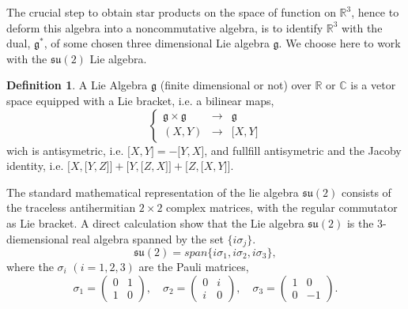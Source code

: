\documentclass[a4paper,11pt]{article} %
\numberwithin{equation}{section} %
\numberwithin{figure}{section} %
\theoremstyle{plain} %
\theoremstyle{definition} %
\newtheorem{dfn}{Definition}[section]
\theoremstyle{remark} %
\begin{document}
\noindent
The crucial step  to obtain star products on the space of function on $\mathbb{R}^3$, hence to deform this algebra into a noncommutative algebra, is to identify $\mathbb{R}^3$ with the dual, $\mathfrak{g}^*$,  of some chosen three dimensional Lie algebra $\mathfrak{g}$. We choose here to work with the $\mathfrak{su}(2)$ Lie algebra.
\begin{dfn}
A Lie Algebra $\mathfrak{g}$ (finite dimensional or not) over $\mathbb{R}$ or $\mathbb{C}$ is a vetor space equipped with a Lie bracket, i.e. a bilinear maps,
\begin{equation*}
 \left\{ 
  \begin{array}{rcl}
   \mathfrak{g} \times \mathfrak{g} & \rightarrow & \mathfrak{g} \\ 
   (X,Y) & \rightarrow & \big[X,Y\big]
  \end{array}
 \right.
\end{equation*}
wich is antisymetric, i.e. $\big[X,Y\big] = - \big[Y,X\big]$, and fullfill antisymetric and the Jacoby identity, i.e. $\Big[X,\big[Y,Z\big]\Big] + \Big[Y,\big[Z,X\big]\Big] + \Big[Z,\big[X,Y\big]\Big]$.\\
\end{dfn}

\noindent
The standard mathematical representation of the lie algebra $\mathfrak{su}(2)$ consists of the traceless antihermitian $2 \times 2$ complex matrices, with the regular commutator as Lie bracket. A direct calculation show that the Lie algebra $\mathfrak{su}(2)$ is the 3-diemensional real algebra spanned by the set $\{ i \sigma_{j} \}$.
\begin{equation*}
 \mathfrak{su}(2) = span \{ i \sigma_{1} , i \sigma_{2} , i \sigma_{3} \} ,
\end{equation*}
where the $\sigma_i$ $(i=1,2,3)$ are the Pauli matrices,
\begin{equation*}
 \sigma_{1} = 
  \begin{pmatrix}
    0 & 1 \\
    1 & 0 
   \end{pmatrix}, \quad
 \sigma_{2} = 
  \begin{pmatrix}
    0 & i \\
    i & 0 
   \end{pmatrix}, \quad
 \sigma_{3} = 
  \begin{pmatrix}
    1 & 0 \\
    0 & -1 
   \end{pmatrix}. 
\end{equation*}
\end{document}
